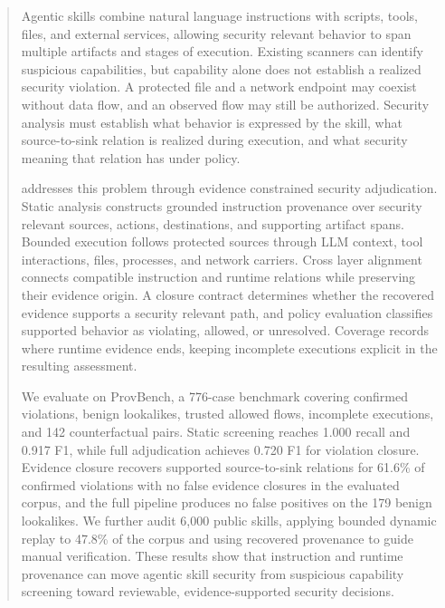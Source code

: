 \begin{abstract}
Agentic skills combine natural language instructions with scripts, tools,
files, and external services, allowing security relevant behavior to span
multiple artifacts and stages of execution. Existing scanners can identify
suspicious capabilities, but capability alone does not establish a realized
security violation. A protected file and a network endpoint may coexist
without data flow, and an observed flow may still be authorized. Security
analysis must establish what behavior is expressed by the skill, what
source-to-sink relation is realized during execution, and what security meaning
that relation has under policy.

\system addresses this problem through evidence constrained security
adjudication. Static analysis constructs grounded instruction provenance over
security relevant sources, actions, destinations, and supporting artifact
spans. Bounded execution follows protected sources through LLM context, tool
interactions, files, processes, and network carriers. Cross layer alignment
connects compatible instruction and runtime relations while preserving their
evidence origin. A closure contract determines whether the recovered evidence
supports a security relevant path, and policy evaluation classifies supported
behavior as violating, allowed, or unresolved. Coverage records where runtime
evidence ends, keeping incomplete executions explicit in the resulting
assessment.

We evaluate \system on ProvBench, a 776-case benchmark covering confirmed
violations, benign lookalikes, trusted allowed flows, incomplete executions,
and 142 counterfactual pairs. Static screening reaches 1.000 recall and 0.917
F1, while full adjudication achieves 0.720 F1 for violation closure. Evidence
closure recovers supported source-to-sink relations for 61.6\% of confirmed
violations with no false evidence closures in the evaluated corpus, and the
full pipeline produces no false positives on the 179 benign lookalikes. We
further audit 6,000 public skills, applying bounded dynamic replay to 47.8\% of
the corpus and using recovered provenance to guide manual verification. These
results show that instruction and runtime provenance can move agentic skill
security from suspicious capability screening toward reviewable,
evidence-supported security decisions.
\end{abstract}